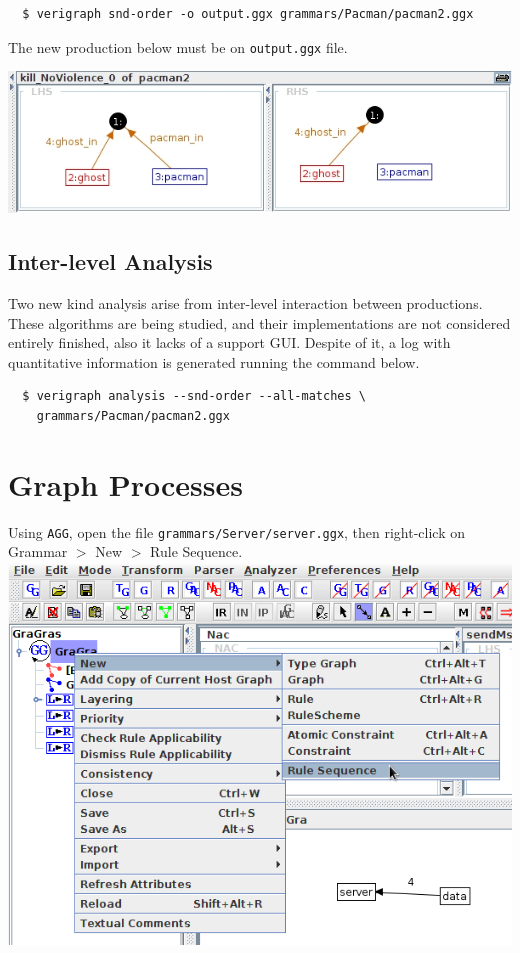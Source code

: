 \documentclass[12pt]{article}
\newenvironment{tutorialstep}
	{\hspace{-\parindent}\begin{minipage}{\textwidth}}
    {\vspace{.3cm}\end{minipage}}
\begin{document}
\begin{verbatim}
  $ verigraph snd-order -o output.ggx grammars/Pacman/pacman2.ggx
\end{verbatim}

The new production below must be on \texttt{output.ggx} file.

{\noindent\centering\includegraphics[scale = 0.5]{img/snd-order/kill.png}\\}

\subsection{Inter-level Analysis}

Two new kind analysis arise from inter-level interaction between productions.
These algorithms are being studied, and their implementations are not considered entirely finished, also it lacks of a support GUI.
Despite of it, a log with quantitative information is generated running the command below.

\begin{verbatim}
  $ verigraph analysis --snd-order --all-matches \
  	grammars/Pacman/pacman2.ggx
\end{verbatim}

\pagebreak

\section{Graph Processes}

\begin{tutorialstep}
  Using \texttt{AGG}, open the file \texttt{grammars/Server/server.ggx}, then right-click on Grammar $>$ New $>$ Rule Sequence. \\

  \noindent
  \centering
  \includegraphics[scale = 0.6]{img/concurrent-rules/rule-sequence_01.png}
\end{tutorialstep}
\end{document}
